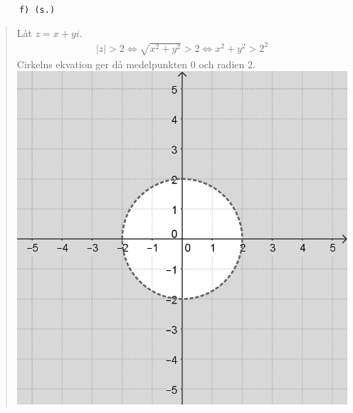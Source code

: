 \documentclass[a4paper]{article}
\newcommand{\tskcol}[1]{\textcolor{tskcol}{#1}}
\begin{document}
	\texttt{\tskcol{~~~~~~f) (s.)}}
	\begin{quotation}
		\noindent
		Låt $z=x+yi$.
		\begin{align*}
		|z| > 2 \Leftrightarrow
		\sqrt{x^2+y^2} > 2 \Leftrightarrow
		x^2+y^2 > 2^2
		\end{align*}
		Cirkelns ekvation ger då medelpunkten $0$ och radien $2$. \\
		\includegraphics[scale=0.2]{images/612f.PNG}
	\end{quotation}
	
\end{document}

